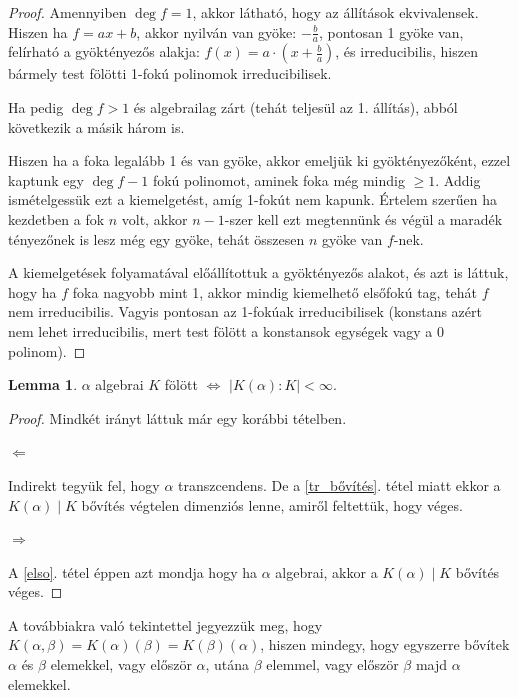 \documentclass[12pt]{book}
\theoremstyle{plain} %
\theoremstyle{definition} %
\newtheorem{lem/}{Lemma}[section]
\newenvironment{lem}
  {\renewcommand{\qedsymbol}{$\clubsuit$}%
   \pushQED{\qed}\begin{lem/}}
  {\popQED\end{lem/}}
\theoremstyle{remark}
\renewcommand\qedsymbol{$\blacksquare$}
\numberwithin{equation}{section}  %
\begin{document}
	\begin{proof}
		Amennyiben $\deg f = 1$, akkor látható, hogy az állítások ekvivalensek. Hiszen ha $f=ax+b$, akkor nyilván van gyöke: $-\frac{b}{a}$, pontosan 1 gyöke van, felírható a gyöktényezős alakja: $f(x)=a\cdot (x+\frac{b}{a})$, és irreducibilis, hiszen bármely test fölötti 1-fokú polinomok irreducibilisek.
		
		Ha pedig $\deg f > 1$ és algebrailag zárt (tehát teljesül az 1. állítás), abból következik a másik három is.
		
		Hiszen ha a foka legalább 1 és van gyöke, akkor emeljük ki gyöktényezőként, ezzel kaptunk egy $\deg f -1$ fokú polinomot, aminek foka még mindig $\geq 1$. Addig ismételgessük ezt a kiemelgetést, amíg 1-fokút nem kapunk. Értelem szerűen ha kezdetben a fok $n$ volt, akkor $n-1$-szer kell ezt megtennünk és végül a maradék tényezőnek is lesz még egy gyöke, tehát összesen $n$ gyöke van $f$-nek.
		
		A kiemelgetések folyamatával előállítottuk a gyöktényezős alakot, és azt is láttuk, hogy ha $f$ foka nagyobb mint 1, akkor mindig kiemelhető elsőfokú tag, tehát $f$ nem irreducibilis. Vagyis pontosan az 1-fokúak irreducibilisek (konstans azért nem lehet irreducibilis, mert test fölött a konstansok egységek vagy a 0 polinom).
	\end{proof}

	\begin{lem}\label{segedtetel}
		$\alpha$ algebrai $K$ fölött $\Leftrightarrow$ $|K(\alpha):K|<\infty$.
	\end{lem}

	\begin{proof}
		Mindkét irányt láttuk már egy korábbi tételben.
		
		\textit{$\Leftarrow$}
		
		Indirekt tegyük fel, hogy $\alpha$ transzcendens. De a \ref{tr_bővítés}. tétel miatt ekkor a $K(\alpha)\mid K$ bővítés végtelen dimenziós lenne, amiről feltettük, hogy véges.
		
		\textit{$\Rightarrow$}
		
		A \ref{elso}. tétel éppen azt mondja hogy ha $\alpha$ algebrai, akkor a $K(\alpha)\mid K$ bővítés véges.
	\end{proof}

	A továbbiakra való tekintettel jegyezzük meg, hogy $K(\alpha,\beta)=K(\alpha)(\beta)=K(\beta)(\alpha)$, hiszen mindegy, hogy egyszerre bővítek $\alpha$ és $\beta$ elemekkel, vagy először $\alpha$, utána $\beta$ elemmel, vagy először $\beta$ majd $\alpha$ elemekkel.
\end{document}
